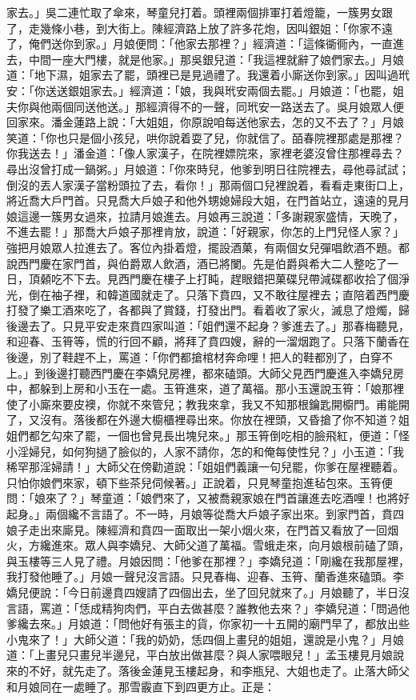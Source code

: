 \begin{showcontents}{}
家去。」吳二連忙取了傘來，琴童兒打着。頭裡兩個排軍打着燈籠，一簇男女跟了，走幾條小巷，到大街上。陳經濟路上放了許多花炮，因叫銀姐：「你家不遠了，俺們送你到家。」月娘便問：「他家去那裡？」經濟道：「這條衚衕內，一直進去，中間一座大門樓，就是他家。」那吳銀兒道：「我這裡就辭了娘們家去。」月娘道：「地下濕，姐家去了罷，頭裡已是見過禮了。我還着小廝送你到家。」因叫過玳安：「你送送銀姐家去。」經濟道：「娘，我與玳安兩個去罷。」月娘道：「也罷，姐夫你與他兩個同送他送。」那經濟得不的一聲，同玳安一路送去了。吳月娘眾人便回家來。潘金蓮路上說：「大姐姐，你原說咱每送他家去，怎的又不去了？」月娘笑道：「你也只是個小孩兒，哄你說着耍了兒，你就信了。皕春院裡那處是那裡？你我送去！」潘金道：「像人家漢子，在院裡嫖院來，家裡老婆沒曾住那裡尋去？尋出沒曾打成一鍋粥。」月娘道：「你來時兒，他爹到明日往院裡去，尋他尋試試；倒沒的丟人家漢子當粉頭拉了去，看你！」那兩個口兒裡說着，看看走東街口上，將近喬大戶門首。只見喬大戶娘子和他外甥媳婦段大姐，在門首站立，遠遠的見月娘這邊一簇男女過來，拉請月娘進去。月娘再三說道：「多謝親家盛情，天晚了，不進去罷！」那喬大戶娘子那裡肯放，說道：「好親家，你怎的上門兒怪人家？」強把月娘眾人拉進去了。客位內掛着燈，擺設酒菓，有兩個女兒彈唱飲酒不題。都說西門慶在家門首，與伯爵眾人飲酒，酒已將闌。先是伯爵與希大二人整吃了一日，頂顙吃不下去。見西門慶在樓子上打盹，趕眼錯把菓碟兒帶減碟都收拾了個淨光，倒在袖子裡，和韓道國就走了。只落下賁四，又不敢往屋裡去；直陪着西門慶打發了樂工酒來吃了，各都與了賞錢，打發出門。看着收了家火，滅息了燈燭，歸後邊去了。只見平安走來賁四家叫道：「姐們還不起身？爹進去了。」那春梅聽見，和迎春、玉筲等，慌的行回不顧，將拜了賁四嫂，辭的一溜烟跑了。只落下蘭香在後邊，別了鞋趕不上，罵道：「你們都搶棺材奔命哩！把人的鞋都別了，白穿不上。」到後邊打聽西門慶在李嬌兒房裡，都來磕頭。大師父見西門慶進入李嬌兒房中，都躲到上房和小玉在一處。玉筲進來，道了萬福。那小玉還說玉筲：「娘那裡使了小廝來要皮襖，你就不來管兒；教我來拿，我又不知那根鑰匙開櫥門。甫能開了，又沒有。落後都在外邊大櫥櫃裡尋出來。你放在裡頭，又昏搶了你不知道？姐姐們都乞勾來了罷，一個也曾見長出塊兒來。」那玉筲倒吃相的臉飛紅，便道：「怪小淫婦兒，如何狗撾了臉似的，人家不請你，怎的和俺每使性兒？」小玉道：「我稀罕那淫婦請！」大師父在傍勸道說：「姐姐們義讓一句兒罷，你爹在屋裡聽着。只怕你娘們來家，頓下些茶兒伺候著。」正說着，只見琴童抱進毡包來。玉筲便問：「娘來了？」琴童道：「娘們來了，又被喬親家娘在門首讓進去吃酒哩！也將好起身。」兩個纔不言語了。不一時，月娘等從喬大戶娘子家出來。到家門首，賁四娘子走出來廝見。陳經濟和賁四一面取出一架小烟火來，在門首又看放了一回烟火，方纔進來。眾人與李嬌兒、大師父道了萬福。雪蛾走來，向月娘根前磕了頭，與玉樓等三人見了禮。月娘因問：「他爹在那裡？」李嬌兒道：「剛纔在我那屋裡，我打發他睡了。」月娘一聲兒沒言語。只見春梅、迎春、玉筲、蘭香進來磕頭。李嬌兒便說：「今日前邊賁四嫂請了四個出去，坐了回兒就來了。」月娘聽了，半日沒言語，罵道：「恁成精狗肉們，平白去做甚麼？誰教他去來？」李嬌兒道：「問過他爹纔去來。」月娘道：「問他好有張主的貨，你家初一十五開的廟門早了，都放出些小鬼來了！」大師父道：「我的奶奶，恁四個上畫兒的姐姐，還說是小鬼？」月娘道：「上畫兒只畫兒半邊兒，平白放出做甚麼？與人家喂眼兒！」孟玉樓見月娘說來的不好，就先走了。落後金蓮見玉樓起身，和李瓶兒、大姐也走了。止落大師父和月娘同在一處睡了。那雪霰直下到四更方止。正是：


\end{showcontents}
